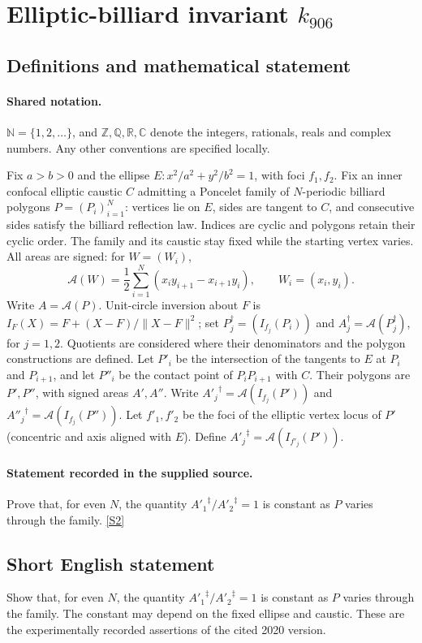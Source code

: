 \documentclass[11pt]{article}
\newcommand{\sref}[2]{\hyperlink{source:#1:#2}{[S#2]}}
\begin{document}
\section{Elliptic-billiard invariant $k_{906}$}\label{statement}

\subsection{Definitions and mathematical statement}

\paragraph{Shared notation.}$\mathbb N=\{1,2,\ldots\}$, and $\mathbb Z,\mathbb Q,\mathbb R,\mathbb C$ denote the integers, rationals, reals and complex numbers. Any other conventions are specified locally.


Fix $a>b>0$ and the ellipse $E:x^2/a^2+y^2/b^2=1$, with foci $f_1,f_2$. Fix an inner confocal elliptic caustic $C$ admitting a Poncelet family of $N$-periodic billiard polygons $P=(P_i)_{i=1}^N$: vertices lie on $E$, sides are tangent to $C$, and consecutive sides satisfy the billiard reflection law. Indices are cyclic and polygons retain their cyclic order. The family and its caustic stay fixed while the starting vertex varies. All areas are signed: for $W=(W_i)$,
\[\mathcal A(W)=\frac12\sum_{i=1}^N(x_i y_{i+1}-x_{i+1}y_i),\qquad W_i=(x_i,y_i).\]
Write $A=\mathcal A(P)$. Unit-circle inversion about $F$ is $I_F(X)=F+(X-F)/\lVert X-F\rVert^2$; set $P_j^\dagger=(I_{f_j}(P_i))$ and $A_j^\dagger=\mathcal A(P_j^\dagger)$, for $j=1,2$. Quotients are considered where their denominators and the polygon constructions are defined. Let $P'_i$ be the intersection of the tangents to $E$ at $P_i$ and $P_{i+1}$, and let $P''_i$ be the contact point of $P_iP_{i+1}$ with $C$. Their polygons are $P',P''$, with signed areas $A',A''$. Write ${A'_j}^\dagger=\mathcal A(I_{f_j}(P'))$ and ${A''_j}^\dagger=\mathcal A(I_{f_j}(P''))$. Let $f'_1,f'_2$ be the foci of the elliptic vertex locus of $P'$ (concentric and axis aligned with $E$). Define ${A'_j}^{\ddagger}=\mathcal A(I_{f'_j}(P'))$.
\paragraph{Statement recorded in the supplied source.}
Prove that, for even $N$, the quantity ${A'_1}^\ddagger/{A'_2}^\ddagger=1$ is constant as $P$ varies through the family. \sref{statement}{2}
\subsection{Short English statement}
Show that, for even $N$, the quantity ${A'_1}^\ddagger/{A'_2}^\ddagger=1$ is constant as $P$ varies through the family. The constant may depend on the fixed ellipse and caustic. These are the experimentally recorded assertions of the cited 2020 version.
\end{document}
